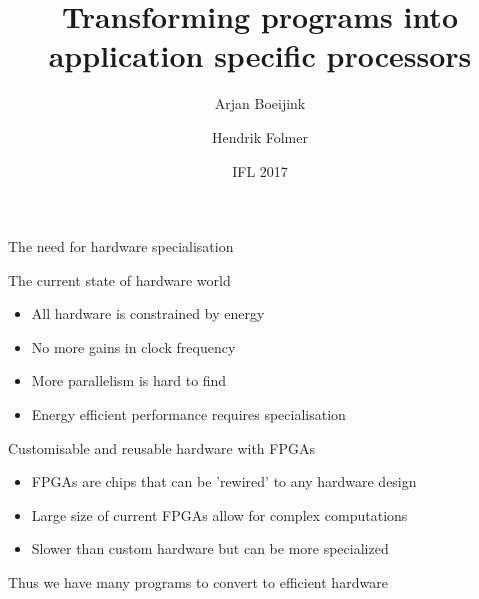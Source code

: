 \documentclass[pdf]{beamer}
\begin{document}
\title{Transforming programs into \\ application specific processors}
\author{Arjan Boeijink \and Hendrik Folmer}
\date{IFL 2017}

\frame{\titlepage}


\begin{frame}{The need for hardware specialisation}

\begin{block}{The current state of hardware world}
\begin{itemize}
\item All hardware is constrained by energy %
\item No more gains in clock frequency %
\item More parallelism is hard to find %
\item Energy efficient performance requires specialisation
\end{itemize}
\end{block}

\begin{block}{Customisable and reusable hardware with FPGAs}
\begin{itemize}
\item FPGAs are chips that can be 'rewired' to any hardware design
\item Large size of current FPGAs allow for complex computations
\item Slower than custom hardware but can be more specialized
\end{itemize}
\end{block}

\alert{Thus we have many programs to convert to efficient hardware}
\end{frame}
\end{document}
